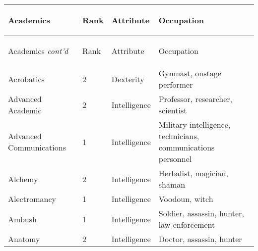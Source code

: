 \documentclass[twoside]{book}
\begin{document}
\begin{longtable}{p{1.25in}llp{12em}} 
  Academics
  &
  \begin{turn}{70}{Rank}\end{turn}
          
  &
  \begin{turn}{70}{Attribute}\end{turn}
          
  &
  \begin{turn}{70}{Occupation}\end{turn}
          
  \\
  \hline
  \hline
  \endfirsthead
  Academics \textit{cont'd}
        
  &
  \begin{turn}{70}{Rank}\end{turn}
          
  &
  \begin{turn}{70}{Attribute}\end{turn}
          
  &
  \begin{turn}{70}{Occupation}\end{turn}
          
  \\
  \hline
  \endhead
      
  \raggedright
           Acrobatics 
  &
   2 
  &
   Dexterity 
  &
   Gymnast, onstage
           performer 
  \tabularnewline
      
  \raggedright
           Advanced Academic 
  &
   2 
  &
   Intelligence 
  &
   Professor, researcher,
           scientist 
  \tabularnewline
      
  \raggedright
           Advanced Communications
           
  &
   1 
  &
   Intelligence 
  &
   Military intelligence,
           technicians, communications personnel 
  \tabularnewline
      
  \raggedright
           Alchemy 
  &
   2 
  &
   Intelligence 
  &
   Herbalist, magician,
           shaman 
  \tabularnewline
      
  \raggedright
           Alectromancy 
  &
   1 
  &
   Intelligence 
  &
   Voodoun, witch 
  \tabularnewline
      
  \raggedright
           Ambush 
  &
   1 
  &
   Intelligence 
  &
   Soldier, assassin,
           hunter, law enforcement 
  \tabularnewline
      
  \raggedright
           Anatomy 
  &
   2 
  &
   Intelligence 
  &
   Doctor, assassin, hunter
           

\end{longtable}
\end{document}
